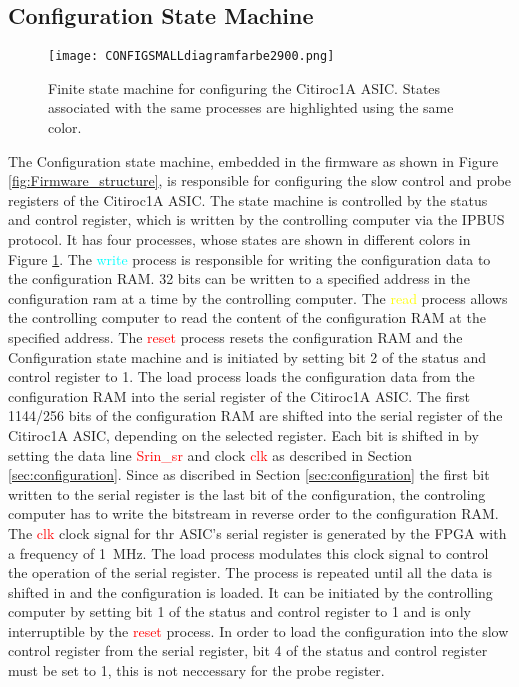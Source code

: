\subsection{Configuration State Machine}
\begin{figure}[H]
    \centering
    \texttt{[image: CONFIGSMALLdiagramfarbe2900.png]}%
    \caption{Finite state machine for configuring the Citiroc1A ASIC.
    States associated with the same processes are highlighted using the same color.}
    \label{fig:Configuration_state_machine}
\end{figure}
The Configuration state machine, embedded  in the firmware as shown in Figure \ref{fig:Firmware_structure}, is responsible for configuring the slow control and probe registers of the Citiroc1A ASIC.
The state machine is controlled by the status and control register, which is written by the controlling computer via the IPBUS protocol.
It has four processes, whose states are shown in different colors in Figure \ref{fig:Configuration_state_machine}.
\newline
The \textcolor{cyan}{write} process is responsible for writing the configuration data to the configuration RAM.
32 bits can be written to a specified address in the configuration ram at a time by the controlling computer.
\newline
The \textcolor{yellow}{read} process allows the controlling computer to read the content of the configuration RAM at the specified address.
\newline
The \textcolor{red}{reset} process resets the configuration RAM and the Configuration state machine and is initiated by setting bit 2 of the status and control register to 1.
\newline
The \textcolor{VioletRed}{load} process loads the configuration data from the configuration RAM into the serial register of the Citiroc1A ASIC. 
The first 1144/256 bits of the configuration RAM are shifted into the serial register of the Citiroc1A ASIC, depending on the selected register.
Each bit is shifted in by setting the data line \textcolor{red}{Srin\_sr} and clock \textcolor{red}{clk} as described in Section \ref{sec:configuration}.
Since as discribed in Section \ref{sec:configuration} the first bit written to the serial register is the last bit of the configuration, the controling computer has to write the bitstream in reverse order to the configuration RAM.
\newline
The \textcolor{red}{clk} clock signal for thr ASIC's serial register is generated by the FPGA with a frequency of \SI{1}{\mega\hertz}.
The \textcolor{VioletRed}{load} process modulates this clock signal to control the operation of the serial register.
\newline
The process is repeated until all the data is shifted in and the configuration is loaded.
It can be initiated by the controlling computer by setting bit 1 of the status and control register to 1 and is only interruptible by the \textcolor{red}{reset} process.
\newline
In order to load the configuration into the slow control register from the serial register, bit 4 of the status and control register must be set to 1, this is not neccessary for the probe register.

